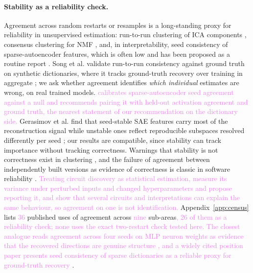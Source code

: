 \documentclass[10pt]{article}
\newcommand{\draft}[1]{\textcolor{violet}{#1}}
\begin{document}
\paragraph{Stability as a reliability check.} Agreement across random restarts or resamples
is a long-standing proxy for reliability in unsupervised estimation: run-to-run clustering
of ICA components \citep{himberg2004icasso}, consensus clustering for NMF
\citep{brunet2004metagenes}, and, in interpretability, seed consistency of sparse-autoencoder
features, which is often low \citep{paulo2025sparse,gerasimov2026unstable} and has been
proposed as a routine report \citep{song2025position}. Song et al.
validate run-to-run consistency against ground truth on synthetic dictionaries, where it
tracks ground-truth recovery over training in aggregate \citep{song2025position}; we ask
whether agreement identifies \emph{which individual} estimates are wrong, on real trained
models. \draft{\citet{liu2026null} calibrates sparse-autoencoder seed agreement against a null
and recommends pairing it with held-out activation agreement and ground truth, the nearest
statement of our recommendation on the dictionary side.} Gerasimov et al. find that seed-stable SAE features carry most of the reconstruction
signal while unstable ones reflect reproducible subspaces resolved differently per seed
\citep{gerasimov2026unstable}; our results are compatible, since stability can track
importance without tracking correctness. Warnings that stability is not correctness exist
in clustering \citep{bendavid2006sober}, and the failure of agreement between independently
built versions as evidence of correctness is classic in software reliability
\citep{knight1986nversion}. \draft{Treating circuit discovery as statistical estimation,
\citet{meloux2025variance} measure its variance under perturbed inputs and changed hyperparameters and propose
reporting it, and \citet{meloux2025everything} show that several circuits and interpretations
can explain the same behaviour, so agreement on one is not identification.} Appendix~\ref{app:census} lists \draft{36} published uses
of agreement across \draft{nine} sub-areas\draft{, 26 of them as a reliability check; none uses the
exact two-restart check tested here. The closest analogue reads agreement across four seeds on
MLP neuron weights as evidence that the recovered directions are genuine structure
\citep{avrahamy2026rotate}, and a widely cited position paper presents seed consistency of sparse
dictionaries as a reliable proxy for ground-truth recovery \citep{song2025position}}.
\end{document}

